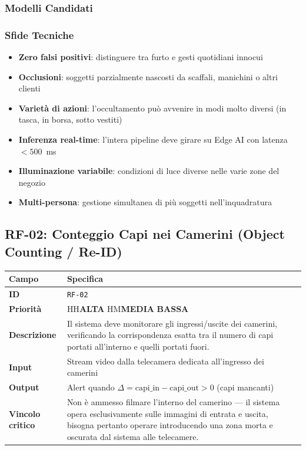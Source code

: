 \documentclass[a4paper, 12pt]{article}
\newcommand{\reqid}[1]{\texttt{\textcolor{visaiblue}{#1}}}
\newcommand{\priority}[1]{%
    \ifx#1H\textcolor{visaired}{\textbf{ALTA}}%
    \else\ifx#1M\textcolor{visaiorange}{\textbf{MEDIA}}%
    \else\textcolor{visaigreen}{\textbf{BASSA}}%
    \fi\fi
}
\begin{document}
\subsubsection{Modelli Candidati}

\subsubsection{Sfide Tecniche}

\begin{itemize}
    \item \textbf{Zero falsi positivi}: distinguere tra furto e gesti quotidiani innocui
    \item \textbf{Occlusioni}: soggetti parzialmente nascosti da scaffali, manichini o altri clienti
    \item \textbf{Varietà di azioni}: l'occultamento può avvenire in modi molto diversi (in tasca, in borsa, sotto vestiti)
    \item \textbf{Inferenza real-time}: l'intera pipeline deve girare su Edge AI con latenza $< 500$~ms
    \item \textbf{Illuminazione variabile}: condizioni di luce diverse nelle varie zone del negozio
    \item \textbf{Multi-persona}: gestione simultanea di più soggetti nell'inquadratura
\end{itemize}


\subsection{RF-02: Conteggio Capi nei Camerini (Object Counting / Re-ID)}

\begin{tabularx}{\textwidth}{lL}
    \toprule
    \textbf{Campo} & \textbf{Specifica} \\
    \midrule
    \textbf{ID} & \reqid{RF-02} \\
    \textbf{Priorità} & \priority{H} \\
    \textbf{Descrizione} & Il sistema deve monitorare gli ingressi/uscite dei camerini, verificando la corrispondenza esatta tra il numero di capi portati all'interno e quelli portati fuori. \\
    \textbf{Input} & Stream video dalla telecamera dedicata all'ingresso dei camerini \\
    \textbf{Output} & Alert quando $\Delta = \text{capi\_in} - \text{capi\_out} > 0$ (capi mancanti) \\
    \textbf{Vincolo critico} & Non è ammesso filmare l'interno del camerino — il sistema opera esclusivamente sulle immagini di entrata e uscita, bisogna pertanto operare introducendo una zona morta e oscurata dal sistema alle telecamere.\\
    \bottomrule
\end{tabularx}
\end{document}
